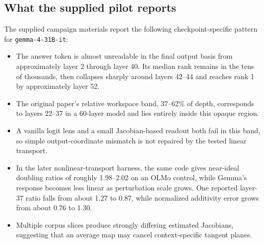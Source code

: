 \documentclass[11pt]{article}
\theoremstyle{definition}
\theoremstyle{remark}
\begin{document}
\subsection{What the supplied pilot reports}
The supplied campaign materials report the following checkpoint-specific pattern for \texttt{gemma-4-31B-it}:
\begin{itemize}
  \item The answer token is almost unreadable in the final output basis from approximately layer 2 through layer 40. Its median rank remains in the tens of thousands, then collapses sharply around layers 42--44 and reaches rank 1 by approximately layer 52.
  \item The original paper's relative workspace band, 37--62\% of depth, corresponds to layers 22--37 in a 60-layer model and lies entirely inside this opaque region.
  \item A vanilla logit lens and a small Jacobian-based readout both fail in this band, so simple output-coordinate mismatch is not repaired by the tested linear transport.
  \item In the later nonlinear-transport harness, the same code gives near-ideal doubling ratios of roughly 1.98--2.02 on an OLMo control, while Gemma's response becomes less linear as perturbation scale grows. One reported layer-37 ratio falls from about 1.27 to 0.87, while normalized additivity error grows from about 0.76 to 1.30.
  \item Multiple corpus slices produce strongly differing estimated Jacobians, suggesting that an average map may cancel context-specific tangent planes.
\end{itemize}
\end{document}
